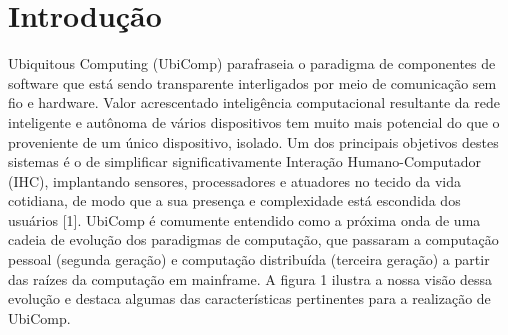 \documentclass[12pt]{article} %
\begin{document}

\section{Introdução} %


Ubiquitous Computing (UbiComp) parafraseia o paradigma de componentes de software que está sendo transparente interligados por meio de comunicação sem fio e hardware. Valor acrescentado inteligência computacional resultante da rede inteligente e autônoma de vários dispositivos tem muito mais potencial do que o proveniente de um único dispositivo, isolado. Um dos principais objetivos destes sistemas é o de simplificar significativamente Interação Humano-Computador (IHC), implantando sensores, processadores e atuadores no tecido da vida cotidiana, de modo que a sua presença e complexidade está escondida dos usuários [1]. UbiComp é comumente entendido como a próxima onda de uma cadeia de evolução dos paradigmas de computação, que passaram a computação pessoal (segunda geração) e computação distribuída (terceira geração) a partir das raízes da computação em mainframe. A figura 1 ilustra a nossa visão dessa evolução e destaca algumas das características pertinentes para a realização de UbiComp.

\end{document}
